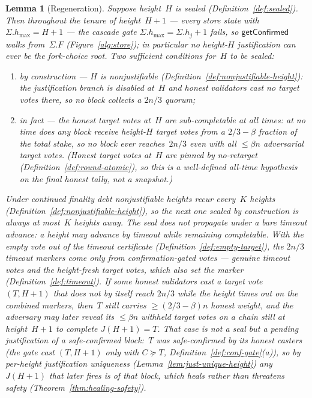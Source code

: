 \ifx\litemode\undefined\documentclass{article}\fi
\newcommand{\hmax}{\ensuremath{h_{\max}}\xspace}
\newcommand{\getConfirmed}{\textsf{getConfirmed}\xspace}
\newcommand{\Knj}{\ensuremath{K}}                      %
\theoremstyle{plain}
\newtheorem{lemma}{Lemma}
\theoremstyle{definition}
\theoremstyle{remark}
\begin{document}
\begin{lemma}[Regeneration]\label{lem:regeneration}
Suppose height~\(H\) is sealed (Definition~\ref{def:sealed}).
Then throughout the tenure of height~\(H+1\) --- every store state with
\(\Sigma.\hmax = H+1\) --- the cascade gate \(\Sigma.\hmax = \Sigma.h_j + 1\)
fails, so \(\getConfirmed\) walks from~\(\Sigma.F\) (Figure~\ref{alg:store});
in particular no height-\(H\) justification can ever be the fork-choice root.
Two sufficient conditions for~\(H\) to be sealed:
\begin{enumerate}[label=(\roman*)]
  \item \emph{by construction} --- \(H\) is nonjustifiable
    (Definition~\ref{def:nonjustifiable-height}): the justification branch is
    disabled at~\(H\) and honest validators cast no target votes there, so no
    block collects a \(2n/3\) quorum;
  \item \emph{in fact} --- the honest target votes at~\(H\) are
    \emph{sub-completable at all times}: at no time does any block receive
    height-\(H\) target votes from a \(2/3 - \beta\) fraction of the total
    stake, so no block ever reaches~\(2n/3\) even with all \(\leq \beta n\)
    adversarial target votes.  (Honest target votes at~\(H\) are pinned by
    no-retarget (Definition~\ref{def:round-atomic}), so this is a well-defined
    all-time hypothesis on the final honest tally, not a snapshot.)
\end{enumerate}
Under continued finality debt nonjustifiable heights recur
every~\(\Knj\) heights (Definition~\ref{def:nonjustifiable-height}), so the next
one sealed \emph{by construction} is always at most~\(\Knj\) heights away.
The \emph{seal} does \emph{not} propagate under a bare timeout advance: a height
may advance by timeout while remaining completable.  With the empty vote out of
the timeout certificate (Definition~\ref{def:empty-target}), the \(2n/3\)
timeout markers come only from confirmation-gated votes --- genuine timeout
votes and the height-fresh target votes, which also set the marker
(Definition~\ref{def:timeout}).  If some honest validators cast a target vote
\((T, H+1)\) that does not by itself reach \(2n/3\) while the height times out on
the combined markers, then~\(T\) still carries \(\geq (2/3 - \beta)n\) honest
weight, and the adversary may later reveal its \(\leq \beta n\) withheld target
votes on a chain still at height~\(H+1\) to complete \(J(H+1) = T\).  That case
is not a seal but a pending justification of a safe-confirmed block:~\(T\) was
safe-confirmed by its honest casters (the gate cast \((T,H+1)\) only with
\(C \succeq T\), Definition~\ref{def:conf-gate}(a)), so by per-height
justification uniqueness (Lemma~\ref{lem:just-unique-height}) any \(J(H+1)\) that
later fires is of that block, which heals rather than threatens safety
(Theorem~\ref{thm:healing-safety}).
\end{lemma}
\end{document}
